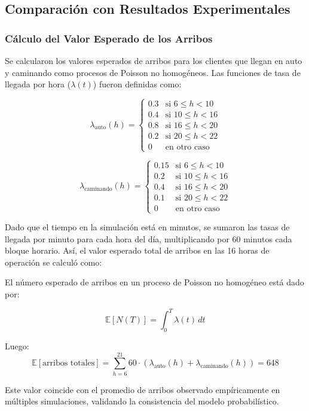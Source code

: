 \documentclass[12pt, a4paper]{article}
\begin{document}
\subsection{Comparación con Resultados Experimentales}

\subsubsection{Cálculo del Valor Esperado de los Arribos}

Se calcularon los valores esperados de arribos para los clientes que llegan en auto y caminando como procesos de Poisson no homogéneos. Las funciones de tasa de llegada por hora ($\lambda(t)$) fueron definidas como:

\[
\lambda_{\text{auto}}(h) = 
\begin{cases}
0.3 & \text{si } 6 \leq h < 10 \\
0.4 & \text{si } 10 \leq h < 16 \\
0.8 & \text{si } 16 \leq h < 20 \\
0.2 & \text{si } 20 \leq h < 22 \\
0 & \text{en otro caso}
\end{cases}
\]

\[
\lambda_{\text{caminando}}(h) = 
\begin{cases}
0.15 & \text{si } 6 \leq h < 10 \\
0.2 & \text{si } 10 \leq h < 16 \\
0.4 & \text{si } 16 \leq h < 20 \\
0.1 & \text{si } 20 \leq h < 22 \\
0 & \text{en otro caso}
\end{cases}
\]

Dado que el tiempo en la simulación está en minutos, se sumaron las tasas de llegada por minuto para cada hora del día, multiplicando por 60 minutos cada bloque horario. Así, el valor esperado total de arribos en las 16 horas de operación se calculó como:

El número esperado de arribos en un proceso de Poisson no homogéneo está dado por:

\[
\mathbb{E}[N(T)] = \int_0^T \lambda(t) \, dt
\]

Luego:
\[
\mathbb{E}[\text{arribos totales}] = \sum_{h=6}^{21} 60 \cdot (\lambda_{\text{auto}}(h) + \lambda_{\text{caminando}}(h)) = 648
\]

Este valor coincide con el promedio de arribos observado empíricamente en múltiples simulaciones, validando la consistencia del modelo probabilístico.
\end{document}
